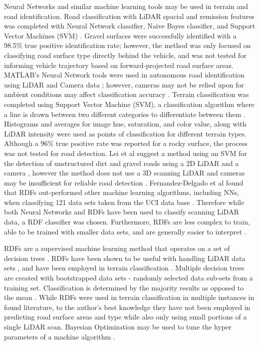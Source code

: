 \documentclass[journal,onecolumn]{IEEEtran}
\begin{document}
	{Neural Networks and similar machine learning tools may be used in terrain and road identification. Road classification with LiDAR spacial and remission features was completed with Neural Network classifier, Naive Bayes classifier, and Support Vector Machines (SVM) \cite{wang_road_nodate,wang_two-stage_2018}. Gravel surfaces were successfully identified with a 98.5\% true positive identification rate; however, the method was only focused on classifying road surface type directly behind the vehicle, and was not tested for informing vehicle trajectory based on forward-projected road surface areas. MATLAB's Neural Network tools were used in autonomous road identification using LiDAR and Camera data \cite{rasmussen_combining_2002}; however, cameras may not be relied upon for ambient conditions may affect classification accuracy \cite{levi_3d_2012_light}. Terrain classification was completed using Support Vector Machine (SVM), a classification algorithm where a line is drawn between two different categories to differentiate between them \cite{wietrzykowski_boosting_2014}. Histograms and averages for image hue, saturation, and color value, along with LiDAR intensity were used as points of classification for different terrain types. Although a 96\% true positive rate was reported for a rocky surface, the process was not tested for road detection. Lei et al suggest a method using an SVM for the detection of unstructured dirt and gravel roads using a 2D LiDAR and a camera \cite{lei_detection_2021}, however the method does not use a 3D scanning LiDAR and cameras may be insufficient for reliable road detection \cite{levi_3d_2012_light}. Fernandez-Delgado et al found that RDFs out-performed other machine learning algorithms, including NNs, when classifying 121 data sets taken from the UCI data base \cite{fernandez2014we}. Therefore while both Neural Networks and RDFs have been used to classify scanning LiDAR data, a RDF classifier was chosen. Furthermore, RDFs are less complex to train, able to be trained with smaller data sets, and are generally easier to interpret \cite{nawar_comparison_2017, bernatz2020comparison, ahmad2017trees}.}
	
	{RDFs are a supervised machine learning method that operates on a set of decision trees \cite{ho_random_1995}. RDFs have been shown to be useful with handling LiDAR data sets \cite{breiman_random_2001}, and have been employed in terrain classification \cite{laible_3d_2012,laible_map_building,laible_terrain_2013,khan_high_2011,reymann_improving_2015,schilling_geometric_2017, wietrzykowski_context-aware_2019}. Multiple decision trees are created with bootstrapped data sets - randomly selected data sub-sets from a training set. Classification is determined by the majority results as opposed to the mean \cite{breiman_random_2001,ho_random_1995}. While RDFs were used in terrain classification in multiple instances in found literature, to the author's best knowledge they have not been employed in predicting road surface areas and type while also only using small portions of a single LiDAR scan. Bayesian Optimization may be used to tune the hyper parameters of a machine algorithm \cite{noauthor_bayesian_nodate, snoek_practical_2012}. }
	
\end{document}
